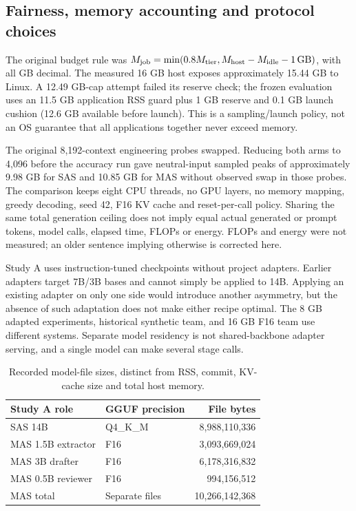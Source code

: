 \subsection{Fairness, memory accounting and protocol choices}
The original budget rule was $M_{\rm job}=\min(0.8M_{\rm tier},M_{\rm host}-M_{\rm idle}-1\,\mathrm{GB})$, with all GB decimal. The measured 16 GB host exposes approximately 15.44 GB to Linux. A 12.49 GB-cap attempt failed its reserve check; the frozen evaluation uses an 11.5 GB application RSS guard plus 1 GB reserve and 0.1 GB launch cushion (12.6 GB available before launch). This is a sampling/launch policy, not an OS guarantee that all applications together never exceed memory.

The original 8,192-context engineering probes swapped. Reducing both arms to 4,096 before the accuracy run gave neutral-input sampled peaks of approximately 9.98 GB for SAS and 10.85 GB for MAS without observed swap in those probes. The comparison keeps eight CPU threads, no GPU layers, no memory mapping, greedy decoding, seed 42, F16 KV cache and reset-per-call policy. Sharing the same total generation ceiling does not imply equal actual generated or prompt tokens, model calls, elapsed time, FLOPs or energy. FLOPs and energy were not measured; an older sentence implying otherwise is corrected here.

Study A uses instruction-tuned checkpoints without project adapters. Earlier adapters target 7B/3B bases and cannot simply be applied to 14B. Applying an existing adapter on only one side would introduce another asymmetry, but the absence of such adaptation does not make either recipe optimal. The 8 GB adapted experiments, historical synthetic team, and 16 GB F16 team use different systems. Separate model residency is not shared-backbone adapter serving, and a single model can make several stage calls.

\begin{table}[ht]
\centering
\begin{tabular}{llr}\toprule
Study A role & GGUF precision & File bytes\\\midrule
SAS 14B & Q4\_K\_M & 8,988,110,336\\
MAS 1.5B extractor & F16 & 3,093,669,024\\
MAS 3B drafter & F16 & 6,178,316,832\\
MAS 0.5B reviewer & F16 & 994,156,512\\
MAS total & Separate files & 10,266,142,368\\\bottomrule
\end{tabular}
\caption{Recorded model-file sizes, distinct from RSS, commit, KV-cache size and total host memory.}\label{tab:weights}
\end{table}


